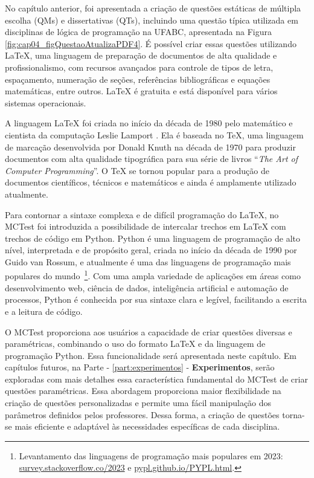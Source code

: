 \label{ch:questoesCodigoMCTest}

No capítulo anterior, foi apresentada a criação de questões estáticas de múltipla escolha (QMs) e dissertativas (QTs), incluindo uma questão típica utilizada em disciplinas de lógica de programação na UFABC, apresentada na Figura \ref{fig:cap04_figQuestaoAtualizaPDF4}. É possível criar essas questões utilizando \LaTeX, uma linguagem de preparação de documentos de alta qualidade e profissionalismo, com recursos avançados para controle de tipos de letra, espaçamento, numeração de seções, referências bibliográficas e equações matemáticas, entre outros. \LaTeX{} é gratuita e está disponível para vários sistemas operacionais.

A linguagem \LaTeX{} foi criada no início da década de 1980 pelo matemático e cientista da computação Leslie Lamport \cite{lamport1985latex}. Ela é baseada no \TeX, uma linguagem de marcação desenvolvida por Donald Knuth na década de 1970 para produzir documentos com alta qualidade tipográfica para sua série de livros ``\textit{The Art of Computer Programming}''. O \TeX{} se tornou popular para a produção de documentos científicos, técnicos e matemáticos e ainda é amplamente utilizado atualmente.

Para contornar a sintaxe complexa e de difícil programação do \LaTeX{}, no MCTest foi introduzida a possibilidade de intercalar trechos em \LaTeX{} com trechos de código em Python. Python é uma linguagem de programação de alto nível, interpretada e de propósito geral, criada no início da década de 1990 por Guido van Rossum, e atualmente é uma das linguagens de programação mais populares do mundo~\footnote{Levantamento das linguagens de programação mais populares em 2023: \href{https://survey.stackoverflow.co/2023}{survey.stackoverflow.co/2023} e  \href{https://pypl.github.io/PYPL.html}{pypl.github.io/PYPL.html}.}. Com uma ampla variedade de aplicações em áreas como desenvolvimento web, ciência de dados, inteligência artificial e automação de processos, Python é conhecida por sua sintaxe clara e legível, facilitando a escrita e a leitura de código. 

O MCTest proporciona aos usuários a capacidade de criar questões diversas e paramétricas, combinando o uso do formato \LaTeX{} e da linguagem de programação Python. Essa funcionalidade será apresentada neste capítulo. Em capítulos futuros, na Parte - \ref{part:experimentos} - \textbf{Experimentos}, serão exploradas com mais detalhes essa característica fundamental do MCTest de criar questões paramétricas.
%
Essa abordagem proporciona maior flexibilidade na criação de questões personalizadas e permite uma fácil manipulação dos parâmetros definidos pelos professores. Dessa forma, a criação de questões torna-se mais eficiente e adaptável às necessidades específicas de cada disciplina.

